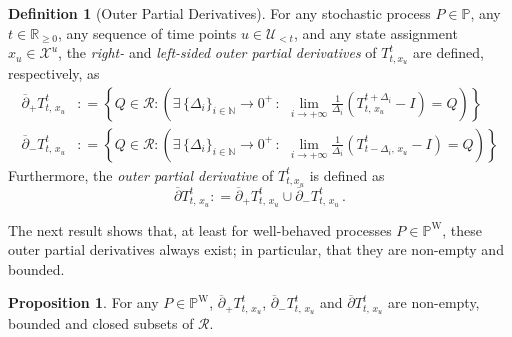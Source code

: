 \documentclass[10pt,a4paper]{paper}
\theoremstyle{definition}
\newtheorem{proposition}[theorem]{Proposition}
\newtheorem{definition}{Definition}
\newcommand{\nats}{\mathbb{N}}
\newcommand{\reals}{\mathbb{R}}
\newcommand{\realsnonneg}{\reals_{\geq 0}}
\newcommand{\states}{\mathcal{X}}
\newcommand{\processes}{\mathbb{P}}
\newcommand{\wprocesses}{\processes^{\mathrm{W}}}
\newcommand{\coloneqq}{:\!=}
\begin{document}
\begin{definition}[Outer Partial Derivatives]\label{def:outerpartialderivatives}
For any stochastic process $P\in\processes$, any $t\in\realsnonneg$, any sequence of time points $u\in\mathcal{U}_{<t}$, and any state assignment $x_u\in\states^u$, the \emph{right-} and \emph{left-sided} \emph{outer partial derivatives} of $T_{t,x_u}^t$ are defined, respectively, as
\begin{align}
\overline{\partial}_{+}
{T^t_{t,\,x_u}}
&\coloneqq
\left\{
Q\in\mathcal{R}
\colon
\left(\exists \,\{\Delta_i\}_{i\in\nats}\to0^+\,:\,
~
\lim_{i\to+\infty}
\frac{1}{\Delta_i}
(T^{t+\Delta_i}_{t,\,x_u}-I)
=Q
\right)
\right\}\label{eq:rightouterderivative}\\
\overline{\partial}_{-}
{T^t_{t,\,x_u}}
&\coloneqq
\left\{
Q\in\mathcal{R}
\colon
\left(\exists\, \{\Delta_i\}_{i\in\nats}\to0^+\,:\,
~
\lim_{i\to+\infty}
\frac{1}{\Delta_i}
(T^{t}_{t-\Delta_i,\,x_u}-I)
=Q
\right)\label{eq:leftouterderivative}
\right\}
\end{align}
Furthermore, the \emph{outer partial derivative} of $T_{t,x_u}^t$ is defined as
\begin{equation*}
\overline{\partial}
{T^t_{t,\,x_u}}
\coloneqq
\overline{\partial}_{+}
{T^t_{t,\,x_u}}
\cup
\overline{\partial}_{-}
{T^t_{t,\,x_u}}\,.
\end{equation*}
\end{definition}

The next result shows that, at least for well-behaved processes $P\in\wprocesses$, these outer partial derivatives always exist; in particular, that they are non-empty and bounded.

\begin{proposition}\label{prop:boundednon-emptyandclosed}
For any $P\in\wprocesses$, $\overline{\partial}_{+}
{T^t_{t,\,x_u}}$, $\overline{\partial}_{-}
{T^t_{t,\,x_u}}$ and $\overline{\partial}
{T^t_{t,\,x_u}}$ are non-empty, bounded and closed subsets of $\mathcal{R}$.
\end{proposition}
\end{document}
